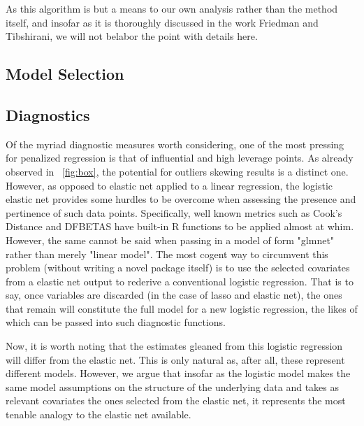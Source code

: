 \documentclass[10pt]{article}
\begin{document}
As this algorithm is but a means to our own analysis rather than the method itself, and insofar as it is thoroughly discussed in the work Friedman and Tibshirani, we will not belabor the point with details here.  


\subsection{Model Selection}

\subsection{Diagnostics}
	Of the myriad diagnostic measures worth considering, one of the most pressing for penalized regression is that of influential and high leverage points.  As already observed in ~\ref{fig:box}, the potential for outliers skewing results is a distinct one.  However, as opposed to elastic net applied to a linear regression, the logistic elastic net provides some hurdles to be overcome when assessing the presence and pertinence of such data points.  Specifically, well known metrics such as Cook's Distance and DFBETAS have built-in R functions to be applied almost at whim.  However, the same cannot be said when passing in a model of form "glmnet" rather than merely "linear model".  The most cogent way to circumvent this problem (without writing a novel package itself) is to use the selected covariates from a elastic net output to rederive a conventional logistic regression.  That is to say, once variables are discarded (in the case of lasso and elastic net), the ones that remain will constitute the full model for a new logistic regression, the likes of which can be passed into such diagnostic functions.  
	
	Now, it is worth noting that the estimates gleaned from this logistic regression will differ from the elastic net.  This is only natural as, after all, these represent different models.  However, we argue that insofar as the logistic model makes the same model assumptions on the structure of the underlying data and takes as relevant covariates the ones selected from the elastic net, it represents the most tenable analogy to the elastic net available.  
	
\end{document}
